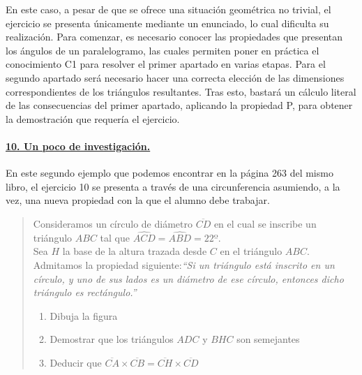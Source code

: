 		En este caso, a pesar de que se ofrece una situación geométrica no trivial, el ejercicio se presenta únicamente mediante un enunciado, lo cual dificulta su realización. Para comenzar, es necesario conocer las propiedades que presentan los ángulos de un paralelogramo, las cuales permiten poner en práctica el conocimiento C1 para resolver el primer apartado en varias etapas. Para el segundo apartado será necesario hacer una correcta elección de las dimensiones correspondientes de los triángulos resultantes. Tras esto, bastará un cálculo literal de las consecuencias del primer apartado, aplicando la propiedad P, para obtener la demostración que requería el ejercicio.
		
	
	\paragraph{\underline{10. Un poco de investigación.}} En este segundo ejemplo que podemos encontrar en la página 263 del mismo libro, el ejercicio 10 se presenta a través de una circunferencia asumiendo, a la vez, una nueva propiedad con la que el alumno debe trabajar.
	
	\begin{center}
		\begin{quote}
			Consideramos un círculo de diámetro $\overline{CD}$ en el cual se inscribe un triángulo $ABC$ tal que $\hat{ACD}=\hat{ABD}=22º$.\\
			Sea $H$ la base de la altura trazada desde $C$ en el triángulo $ABC$.\\
			Admitamos la propiedad siguiente:\textit{``Si un triángulo está inscrito en un círculo, y uno de sus lados es un diámetro de ese círculo, entonces dicho triángulo es rectángulo.''}
			\begin{enumerate}
				\item Dibuja la figura
				\item Demostrar que los triángulos $ADC$ y $BHC$ son semejantes
				\item Deducir que $\overline{CA}\times\overline{CB}=\overline{CH}\times\overline{CD}$
			\end{enumerate}
		\end{quote}
	\end{center}
	
